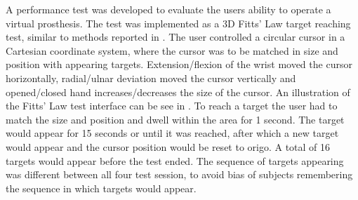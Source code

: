 A performance test was developed to evaluate the users ability to operate a virtual prosthesis. The test was implemented as a 3D Fitts' Law target reaching test, similar to methods reported in \cite{Scheme2013, Scheme2013a}. The user controlled a circular cursor in a Cartesian coordinate system, where the cursor was to be matched in size and position with appearing targets. Extension/flexion of the wrist moved the cursor horizontally, radial/ulnar deviation moved the cursor vertically and opened/closed hand increases/decreases the size of the cursor. An illustration of the Fitts' Law test interface can be see in . To reach a target the user had to match the size and position and dwell within the area for 1 second. The target would appear for 15 seconds or until it was reached, after which a new target would appear and the cursor position would be reset to origo. A total of 16 targets would appear before the test ended. The sequence of targets appearing was different between all four test session, to avoid bias of subjects remembering the sequence in which targets would appear. \\

